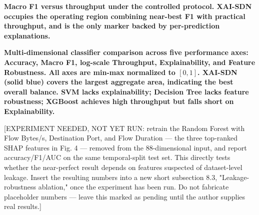 \documentclass{ieeeaccess}
\begin{document}
\begin{table}[!t]
\centering
\caption{Comparative performance under the controlled protocol (10K training / 3K test samples, seed = 42). TRAINING TIME COMPARISONS SHOULD BE READ WITH CAUTION: THE DNN IS TRAINED ON A GPU WHILE ALL OTHER METHODS ARE TRAINED ON A CPU, SO THE REPORTED TRAIN-TIME COLUMN REFLECTS THIS ASYMMETRY RATHER THAN A LIKE-FOR-LIKE COMPARISON.}
\label{tab:comparison}
\end{table}

{ \textbf{Macro F1 versus throughput under the controlled protocol. XAI-SDN occupies the operating region combining near-best F1 with practical throughput, and is the only marker backed by per-prediction explanations.}\label{fig:tradeoff}}

{ \textbf{Multi-dimensional classifier comparison across five performance axes: Accuracy, Macro F1, log-scale Throughput, Explainability, and Feature Robustness. All axes are min-max normalized to $[0,1]$. XAI-SDN (solid blue) covers the largest aggregate area, indicating the best overall balance. SVM lacks explainability; Decision Tree lacks feature robustness; XGBoost achieves high throughput but falls short on Explainability.}\label{fig:radar}}



[EXPERIMENT NEEDED, NOT YET RUN: retrain the Random Forest with Flow Bytes/s, Destination Port, and Flow Duration — the three top-ranked SHAP features in Fig. 4 — removed from the 88-dimensional input, and report accuracy/F1/AUC on the same temporal-split test set. This directly tests whether the near-perfect result depends on features suspected of dataset-level leakage. Insert the resulting numbers into a new short subsection 8.3, "Leakage-robustness ablation," once the experiment has been run. Do not fabricate placeholder numbers — leave this marked as pending until the author supplies real results.]
\end{document}
